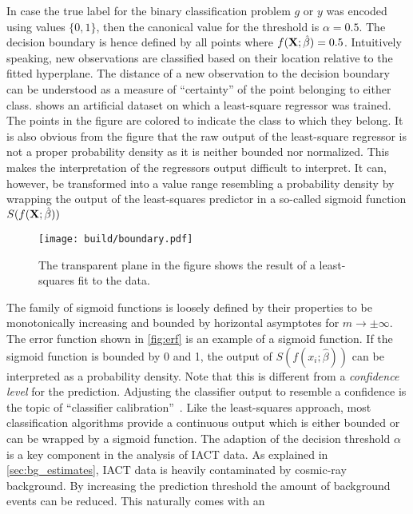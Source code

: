 In case the true label for the binary classification problem $g$ or $y$ was encoded using values $\{0, 1\}$, then 
the canonical value for the threshold is  $\alpha = 0.5$.
The decision boundary is hence defined by all points where $f(\mathbf{X}; \hat{\beta}) = 0.5$.
Intuitively speaking, new observations are classified based on their location relative to the fitted hyperplane. 
The distance of a new observation to the decision boundary can be understood as a measure of \enquote{certainty} of the point belonging to either class. 
 shows an artificial dataset on which a least-square regressor was trained. 
The points in the figure are colored to indicate the class to which they belong. 
It is also obvious from the figure that the raw output of the least-square regressor is not a proper probability density as it is neither bounded nor normalized. 
This makes the interpretation of the regressors output difficult to interpret.
It can, however, be transformed into a value range resembling a probability density by wrapping the output of 
the least-squares predictor in a so-called sigmoid function $S(f(\mathbf{X}; \hat{\beta}))$
\begin{wrapfigure}{o}{0.5\linewidth}
    \centering
    \texttt{[image: build/boundary.pdf]}
    \caption[Least squares machine learning example]{The transparent plane in the figure shows the result of a least-squares fit to the data.
    }
    \label{fig:boundary}
\end{wrapfigure}
The family of sigmoid functions is loosely defined by their properties to be 
monotonically increasing and bounded by horizontal asymptotes %
for $m \rightarrow \pm \infty$.
The error function shown in \cref{fig:erf} is an example of a sigmoid function.
If the sigmoid function is bounded by 0 and 1,
the output of $S(f(x_i; \hat{\beta}))$ can be interpreted as a probability density.
Note that this is different from a \emph{confidence level} for the prediction.
Adjusting the classifier output to resemble a confidence is the topic of \enquote{classifier calibration}~\cite{calibration1, calibration2}.
Like the least-squares approach, most classification algorithms provide a continuous output which is either bounded or can be wrapped 
by a sigmoid function.
The adaption of the decision threshold $\alpha$ is a key component in the analysis of IACT data.
As explained in \cref{sec:bg_estimates}, IACT data is heavily contaminated by cosmic-ray background. 
By increasing the prediction threshold the amount of background events can be reduced. This naturally comes with an 
